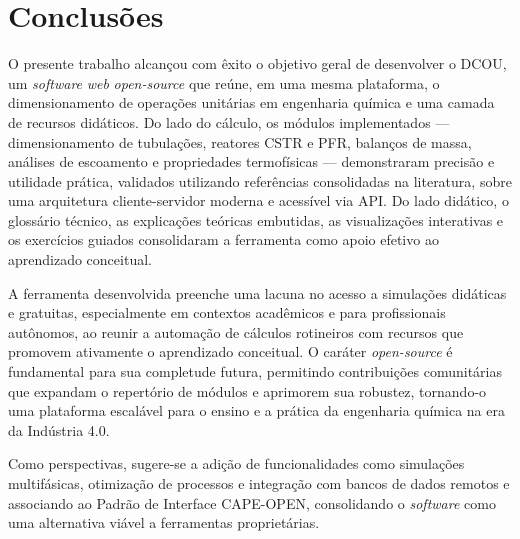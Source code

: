 \chapter{Conclusões}

O presente trabalho alcançou com êxito o objetivo geral de desenvolver o DCOU, um \textit{software} \textit{web} \textit{open-source} que reúne, em uma mesma plataforma, o dimensionamento de operações unitárias em engenharia química e uma camada de recursos didáticos. Do lado do cálculo, os módulos implementados --- dimensionamento de tubulações, reatores CSTR e PFR, balanços de massa, análises de escoamento e propriedades termofísicas --- demonstraram precisão e utilidade prática, validados utilizando referências consolidadas na literatura, sobre uma arquitetura cliente-servidor moderna e acessível via API. Do lado didático, o glossário técnico, as explicações teóricas embutidas, as visualizações interativas e os exercícios guiados consolidaram a ferramenta como apoio efetivo ao aprendizado conceitual.

A ferramenta desenvolvida preenche uma lacuna no acesso a simulações didáticas e gratuitas, especialmente em contextos acadêmicos e para profissionais autônomos, ao reunir a automação de cálculos rotineiros com recursos que promovem ativamente o aprendizado conceitual. O caráter \textit{open-source} é fundamental para sua completude futura, permitindo contribuições comunitárias que expandam o repertório de módulos e aprimorem sua robustez, tornando-o uma plataforma escalável para o ensino e a prática da engenharia química na era da Indústria 4.0.

Como perspectivas, sugere-se a adição de funcionalidades como simulações multifásicas, otimização de processos e integração com bancos de dados remotos e associando ao Padrão de Interface CAPE-OPEN, consolidando o \textit{software} como uma alternativa viável a ferramentas proprietárias.
